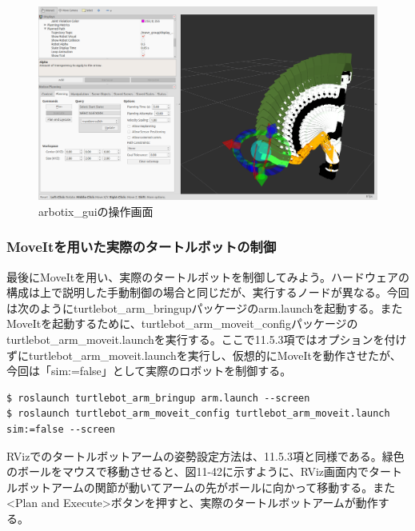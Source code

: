 \begin{figure}[ht]
  \centering
  \includegraphics[width=\columnwidth]{pictures/chapter11/pic_11_41.png}
  \caption{arbotix_guiの操作画面}
\end{figure}

\subsubsection{MoveItを用いた実際のタートルボットの制御}

最後にMoveItを用い、実際のタートルボットを制御してみよう。ハードウェアの構成は上で説明した手動制御の場合と同じだが、実行するノードが異なる。今回は次のようにturtlebot\_arm\_bringupパッケージのarm.launchを起動する。またMoveItを起動するために、turtlebot\_arm\_moveit\_configパッケージのturtlebot\_arm\_moveit.launchを実行する。ここで11.5.3項ではオプションを付けずにturtlebot\_arm\_moveit.launchを実行し、仮想的にMoveItを動作させたが、今回は「sim:=false」として実際のロボットを制御する。

\begin{lstlisting}[language=ROS]
$ roslaunch turtlebot_arm_bringup arm.launch --screen
$ roslaunch turtlebot_arm_moveit_config turtlebot_arm_moveit.launch sim:=false --screen
\end{lstlisting}

RVizでのタートルボットアームの姿勢設定方法は、11.5.3項と同様である。緑色のボールをマウスで移動させると、図11-42に示すように、RViz画面内でタートルボットアームの関節が動いてアームの先がボールに向かって移動する。また<Plan and Execute>ボタンを押すと、実際のタートルボットアームが動作する。

